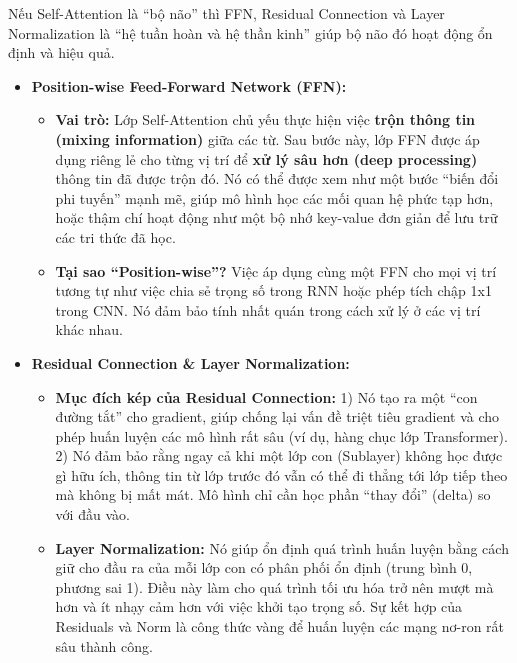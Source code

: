 \begin{tcolorbox}[
    title={Vai trò của các Thành phần Phụ trong Khối Transformer},
    colback=blue!5!white, colframe=blue!50!black, fonttitle=\bfseries
]
Nếu Self-Attention là “bộ não” thì FFN, Residual Connection và Layer Normalization là “hệ tuần hoàn và hệ thần kinh” giúp bộ não đó hoạt động ổn định và hiệu quả.
\begin{itemize}
    \item \textbf{Position-wise Feed-Forward Network (FFN):}
        \begin{itemize}
            \item \textbf{Vai trò:} Lớp Self-Attention chủ yếu thực hiện việc \textbf{trộn thông tin (mixing information)} giữa các từ. Sau bước này, lớp FFN được áp dụng riêng lẻ cho từng vị trí để \textbf{xử lý sâu hơn (deep processing)} thông tin đã được trộn đó. Nó có thể được xem như một bước “biến đổi phi tuyến” mạnh mẽ, giúp mô hình học các mối quan hệ phức tạp hơn, hoặc thậm chí hoạt động như một bộ nhớ key-value đơn giản để lưu trữ các tri thức đã học.
            \item \textbf{Tại sao “Position-wise”?} Việc áp dụng cùng một FFN cho mọi vị trí tương tự như việc chia sẻ trọng số trong RNN hoặc phép tích chập 1x1 trong CNN. Nó đảm bảo tính nhất quán trong cách xử lý ở các vị trí khác nhau.
        \end{itemize}
    \item \textbf{Residual Connection \& Layer Normalization:}
        \begin{itemize}
            \item \textbf{Mục đích kép của Residual Connection:} 1) Nó tạo ra một “con đường tắt” cho gradient, giúp chống lại vấn đề triệt tiêu gradient và cho phép huấn luyện các mô hình rất sâu (ví dụ, hàng chục lớp Transformer). 2) Nó đảm bảo rằng ngay cả khi một lớp con (Sublayer) không học được gì hữu ích, thông tin từ lớp trước đó vẫn có thể đi thẳng tới lớp tiếp theo mà không bị mất mát. Mô hình chỉ cần học phần “thay đổi” (delta) so với đầu vào.
            \item \textbf{Layer Normalization:} Nó giúp ổn định quá trình huấn luyện bằng cách giữ cho đầu ra của mỗi lớp con có phân phối ổn định (trung bình 0, phương sai 1). Điều này làm cho quá trình tối ưu hóa trở nên mượt mà hơn và ít nhạy cảm hơn với việc khởi tạo trọng số. Sự kết hợp của Residuals và Norm là công thức vàng để huấn luyện các mạng nơ-ron rất sâu thành công.
        \end{itemize}
\end{itemize}
\end{tcolorbox}
